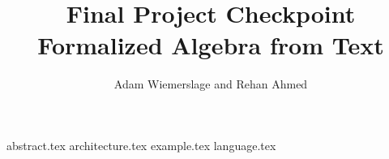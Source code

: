 \documentclass[11pt]{exam}
\title{Final Project Checkpoint\\Formalized Algebra from Text}
\author{Adam Wiemerslage and Rehan Ahmed}
\newcommand*{\sectiondir}{sections/}
\begin{document}
\maketitle

{abstract.tex}
{architecture.tex}
{example.tex}
{language.tex}

\newpage


\end{document}
